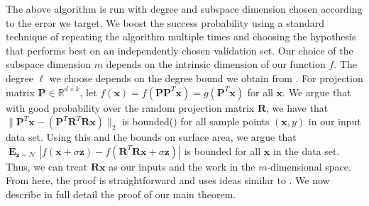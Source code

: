 \documentclass{theoretics}
\newcommand\twonorm[1]{\|#1\|_2}
\renewcommand\vec[1]{\mathbf{#1}}
\DeclareMathOperator*{\pr}{\mathbf{Pr}}
\DeclareMathOperator*{\E}{\mathbf{E}}
\newcommand{\R}{\mathbb{R}}
\newcommand{\1}{\Ind}
\newcommand{\x}{\vec x}
\renewcommand{\vv}{\vec v}
\newcommand{\vu}{\vec u}
\newcommand{\z}{\vec z}
\newcommand{\Gauss}{\mathcal{N}}
\begin{document}
The above algorithm is run with degree and subspace dimension chosen according to the error we target.  We boost the success probability using a standard technique of repeating the algorithm multiple times and choosing the hypothesis that performs best on an independently chosen validation set. Our choice of the subspace dimension $m$ depends on the intrinsic dimension of our function $f$. The degree $\ell$ we choose depends on the degree bound we obtain from . For projection matrix $\vec P\in \R^{d\times k}$, let $f(\x)=f(\vec P\vec P^T\x)=g(\vec P^T\x)$ for all $\x$. We argue that with good probability over the random projection matrix $\vec R$, we have that $\twonorm{\vec P^T\x-(\vec P^T\vec R^T\vec R \x)}$ is bounded() for all sample points $(\x,y)$ in our input data set. Using this and the bounds on surface area, we argue that $\E_{\z\sim \Gauss}|f(\x+\sigma \z)-f(\vec R^T\vec R\x+\sigma \z)|$ is bounded for all $\x$ in the data set. Thus, we can treat $\vec R\x$ as our inputs and the work in the $m$-dimensional space. From here, the proof is straightforward and uses ideas similar to \cite{KKMS:05}. We now describe in full detail the proof of our main theorem.





\end{document}
